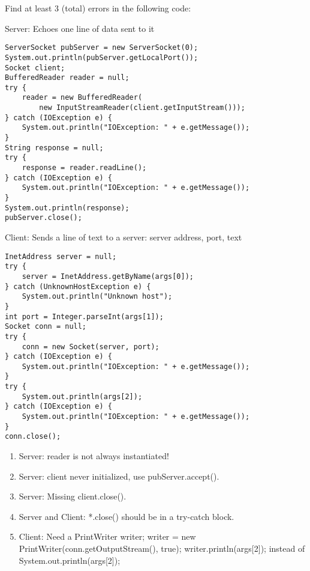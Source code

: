 Find at least 3 (total) errors in the following code:

	Server: Echoes one line of data sent to it
	\begin{lstlisting}
ServerSocket pubServer = new ServerSocket(0);
System.out.println(pubServer.getLocalPort());
Socket client;
BufferedReader reader = null;
try {
	reader = new BufferedReader(
		new InputStreamReader(client.getInputStream()));
} catch (IOException e) {
	System.out.println("IOException: " + e.getMessage());
}
String response = null;
try {
	response = reader.readLine();
} catch (IOException e) {
	System.out.println("IOException: " + e.getMessage());
}
System.out.println(response);
pubServer.close();
	\end{lstlisting}

	Client: Sends a line of text to a server: server address, port, text
	\begin{lstlisting}
InetAddress server = null;
try {
	server = InetAddress.getByName(args[0]);
} catch (UnknownHostException e) {
	System.out.println("Unknown host");
}
int port = Integer.parseInt(args[1]);
Socket conn = null;
try {
	conn = new Socket(server, port);
} catch (IOException e) {
	System.out.println("IOException: " + e.getMessage());
}
try {
	System.out.println(args[2]);
} catch (IOException e) {
	System.out.println("IOException: " + e.getMessage());
}
conn.close();
	\end{lstlisting}
	\begin{answer}
		\begin{enumerate}
		\item
			Server: reader is not always instantiated!
		\item
			Server: client never initialized, use pubServer.accept().
		\item
			Server: Missing client.close().
		\item
			Server and Client: *.close() should be in a try-catch block.
		\item
			Client: Need a PrintWriter writer; writer = new PrintWriter(conn.getOutputStream(), true); writer.println(args[2]); instead of System.out.println(args[2]);
		\end{enumerate}
	\end{answer}